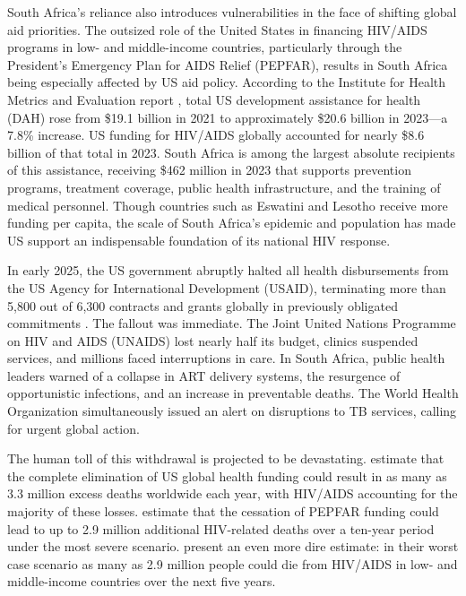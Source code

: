 \documentclass[letterpaper,12pt]{article}
\theoremstyle{definition}
\begin{document}
\begin{spacing}{1.5}
South Africa's reliance also introduces vulnerabilities in the face of shifting global aid priorities. The outsized role of the United States in financing HIV/AIDS programs in low- and middle-income countries, particularly through the President's Emergency Plan for AIDS Relief (PEPFAR), results in South Africa being especially affected by US aid policy. According to the Institute for Health Metrics and Evaluation report \citep{FGH2023}, total US development assistance for health (DAH) rose from \$\num{19.1} billion in 2021 to approximately \$\num{20.6} billion in 2023—a \num{7.8}\% increase. US funding for HIV/AIDS globally accounted for nearly \$\num{8.6} billion of that total in 2023. South Africa is among the largest absolute recipients of this assistance, receiving \$462 million in 2023 that supports prevention programs, treatment coverage, public health infrastructure, and the training of medical personnel. Though countries such as Eswatini and Lesotho receive more funding per capita, the scale of South Africa's epidemic and population has made US support an indispensable foundation of its national HIV response.

In early 2025, the US government abruptly halted all health disbursements from the US Agency for International Development (USAID), terminating more than 5,800 out of 6,300 contracts and grants globally in previously obligated commitments \citep{Cohen2025}. The fallout was immediate. The Joint United Nations Programme on HIV and AIDS (UNAIDS) lost nearly half its budget, clinics suspended services, and millions faced interruptions in care. In South Africa, public health leaders warned of a collapse in ART delivery systems, the resurgence of opportunistic infections, and an increase in preventable deaths. The World Health Organization simultaneously issued an alert on disruptions to TB services, calling for urgent global action.

The human toll of this withdrawal is projected to be devastating. \citet{KS2025} estimate that the complete elimination of US global health funding could result in as many as \num{3.3} million excess deaths worldwide each year, with HIV/AIDS accounting for the majority of these losses. \citet{Gandhi2025} estimate that the cessation of PEPFAR funding could lead to up to \num{2.9} million additional HIV-related deaths over a ten-year period under the most severe scenario.  present an even more dire estimate: in their worst case scenario as many as \num{2.9} million people could die from HIV/AIDS in low- and middle-income countries over the next five years.


\end{spacing}
\end{document}
